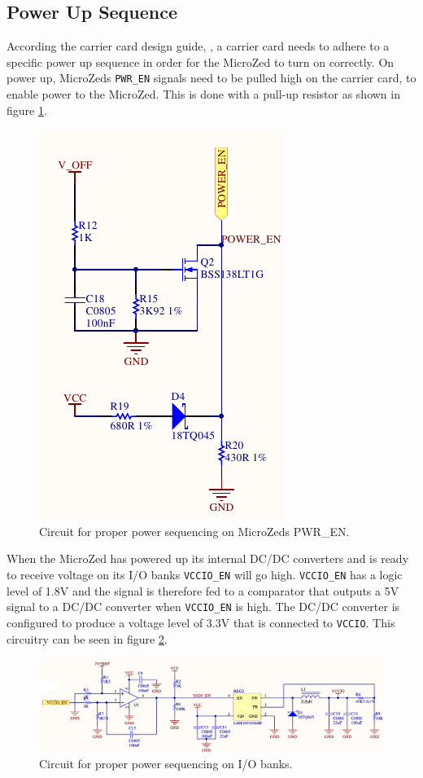 \subsection{Power Up Sequence} %
\label{sub:power_up_sequence}
According the carrier card design guide, \cite{design_carrier}, a carrier card needs to adhere to a specific power up sequence in order for the MicroZed to turn on correctly.
On power up, MicroZeds \texttt{PWR\_EN} signals need to be pulled high on the carrier card, to enable power to the MicroZed.
This is done with a pull-up resistor as shown in figure \ref{fig:pwr_en_circuit}.

\begin{figure}[h]
	\centering
	\includegraphics[width=.3\linewidth]{graphics/power_en_sch.pdf}
	\caption{Circuit for proper power sequencing on MicroZeds PWR\_EN.}
	\label{fig:pwr_en_circuit}
\end{figure}

When the MicroZed has powered up its internal DC/DC converters and is ready to receive voltage on its I/O banks \texttt{VCCIO\_EN} will go high.
\texttt{VCCIO\_EN} has a logic level of 1.8V and the signal is therefore fed to a comparator that outputs a 5V signal to a DC/DC converter when \texttt{VCCIO\_EN} is high.
The DC/DC converter is configured to produce a voltage level of 3.3V that is connected to \texttt{VCCIO}.
This circuitry can be seen in figure \ref{fig:pwr_io_circuit}.

\begin{figure}[h]
	\centering
	\includegraphics[width=1\linewidth]{graphics/vccio_power_up.png}
	\caption{Circuit for proper power sequencing on I/O banks.}
	\label{fig:pwr_io_circuit}
\end{figure}

